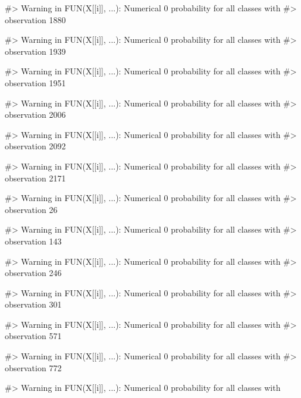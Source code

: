\begin{Schunk}
\begin{Soutput}
#> Warning in FUN(X[[i]], ...): Numerical 0 probability for all classes with
#> observation 1880
\end{Soutput}
\begin{Soutput}
#> Warning in FUN(X[[i]], ...): Numerical 0 probability for all classes with
#> observation 1939
\end{Soutput}
\begin{Soutput}
#> Warning in FUN(X[[i]], ...): Numerical 0 probability for all classes with
#> observation 1951
\end{Soutput}
\begin{Soutput}
#> Warning in FUN(X[[i]], ...): Numerical 0 probability for all classes with
#> observation 2006
\end{Soutput}
\begin{Soutput}
#> Warning in FUN(X[[i]], ...): Numerical 0 probability for all classes with
#> observation 2092
\end{Soutput}
\begin{Soutput}
#> Warning in FUN(X[[i]], ...): Numerical 0 probability for all classes with
#> observation 2171
\end{Soutput}
\begin{Soutput}
#> Warning in FUN(X[[i]], ...): Numerical 0 probability for all classes with
#> observation 26
\end{Soutput}
\begin{Soutput}
#> Warning in FUN(X[[i]], ...): Numerical 0 probability for all classes with
#> observation 143
\end{Soutput}
\begin{Soutput}
#> Warning in FUN(X[[i]], ...): Numerical 0 probability for all classes with
#> observation 246
\end{Soutput}
\begin{Soutput}
#> Warning in FUN(X[[i]], ...): Numerical 0 probability for all classes with
#> observation 301
\end{Soutput}
\begin{Soutput}
#> Warning in FUN(X[[i]], ...): Numerical 0 probability for all classes with
#> observation 571
\end{Soutput}
\begin{Soutput}
#> Warning in FUN(X[[i]], ...): Numerical 0 probability for all classes with
#> observation 772
\end{Soutput}
\begin{Soutput}
#> Warning in FUN(X[[i]], ...): Numerical 0 probability for all classes with

\end{Soutput}
\end{Schunk}
